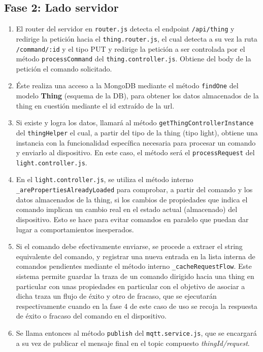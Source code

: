 \subsection{Fase 2: Lado servidor}
\label{ch:Capitulo5.3.2}
\begin{enumerate}
\item  El router del servidor en \verb|router.js| detecta el endpoint \verb|/api/thing| y redirige la petición hacia el \verb|thing.router.js|, el cual detecta a su vez la ruta \verb|/command/:id| y el tipo PUT y redirige la petición a ser controlada por el método \verb|processCommand| del \verb|thing.controller.js|. Obtiene del body de la petición el comando solicitado.

\item  Éste realiza una acceso a la MongoDB mediante el método \verb|findOne| del modelo \textbf{Thing} (esquema de la DB), para obtener los datos almacenados de la thing en cuestión mediante el id extraído de la url.

\item  Si existe y logra los datos, llamará al método \verb|getThingControllerInstance| del \verb|thingHelper| el cual, a partir del tipo de la thing (tipo light), obtiene una instancia con la funcionalidad específica necesaria para procesar un comando y enviarlo al dispositivo. En este caso, el método será el \verb|processRequest| del \verb|light.controller.js|.

\item  En el \verb|light.controller.js|, se utiliza el método interno \verb|_arePropertiesAlreadyLoaded| para comprobar, a partir del comando y los datos almacenados de la thing, si los cambios de propiedades que indica el comando implican un cambio real en el estado actual (almacenado) del dispositivo. Esto se hace para evitar comandos en paralelo que puedan dar lugar a comportamientos inesperados.

\item  Si el comando debe efectivamente enviarse, se procede a extraer el string equivalente del comando, y registrar una nueva entrada en la lista interna de comandos pendientes mediante el método interno \verb|_cacheRequestFlow|. Este sistema permite guardar la traza de un comando dirigido hacia una thing en particular con unas propiedades en particular con el objetivo de asociar a dicha traza un flujo de éxito y otro de fracaso, que se ejecutarán respectivamente cuando en la fase 4 de este caso de uso se recoja la respuesta de éxito o fracaso del comando en el dispositivo.

\item  Se llama entonces al método \verb|publish| del \verb|mqtt.service.js|, que se encargará a su vez de publicar el mensaje final en el topic compuesto \textit{thingId/request}.
\end{enumerate}

